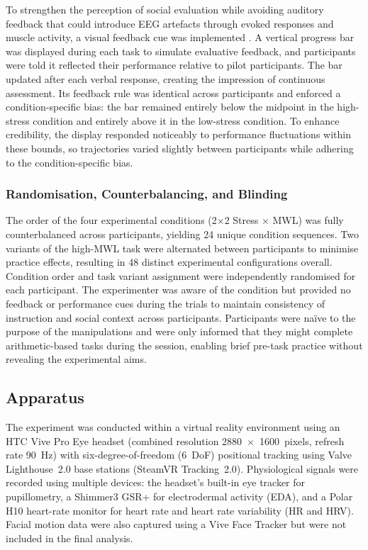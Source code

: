 \documentclass[lettersize,journal]{IEEEtran}
\begin{document}
To strengthen the perception of social evaluation while avoiding auditory feedback that could introduce EEG artefacts through evoked responses and muscle activity, a visual feedback cue was implemented \cite{ahissarSpeechComprehensionCorrelated2001}. A vertical progress bar was displayed during each task to simulate evaluative feedback, and participants were told it reflected their performance relative to pilot participants. The bar updated after each verbal response, creating the impression of continuous assessment. Its feedback rule was identical across participants and enforced a condition-specific bias: the bar remained entirely below the midpoint in the high-stress condition and entirely above it in the low-stress condition. To enhance credibility, the display responded noticeably to performance fluctuations within these bounds, so trajectories varied slightly between participants while adhering to the condition-specific bias. 

\subsubsection{Randomisation, Counterbalancing, and Blinding}
The order of the four experimental conditions (2×2 Stress × MWL) was fully counterbalanced across participants, yielding 24 unique condition sequences. Two variants of the high-MWL task were alternated between participants to minimise practice effects, resulting in 48 distinct experimental configurations overall. Condition order and task variant assignment were independently randomised for each participant. The experimenter was aware of the condition but provided no feedback or performance cues during the trials to maintain consistency of instruction and social context across participants. Participants were naïve to the purpose of the manipulations and were only informed that they might complete arithmetic-based tasks during the session, enabling brief pre-task practice without revealing the experimental aims.

\subsection{Apparatus}
The experiment was conducted within a virtual reality environment using an HTC Vive Pro Eye headset (combined resolution 2880~\(\times\)~1600~pixels, refresh rate 90~Hz) with six-degree-of-freedom (6~DoF) positional tracking using Valve Lighthouse~2.0 base stations (SteamVR Tracking~2.0). Physiological signals were recorded using multiple devices: the headset’s built-in eye tracker for pupillometry, a Shimmer3 GSR+ for electrodermal activity (EDA), and a Polar H10 heart-rate monitor for heart rate and heart rate variability (HR and HRV). Facial motion data were also captured using a Vive Face Tracker but were not included in the final analysis.  
\end{document}
